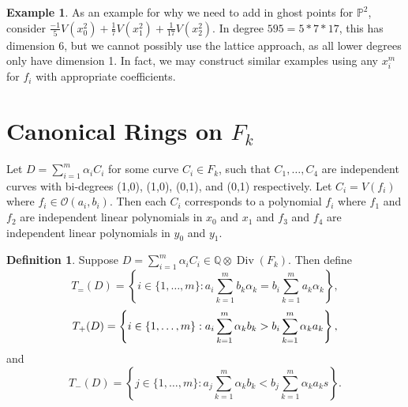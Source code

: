 \documentclass{amsart}
\theoremstyle{plain}
\theoremstyle{definition}
\newtheorem{defn}[thm]{Definition}
\newtheorem{example}[thm]{Example}
\theoremstyle{remark}
\numberwithin{equation}{section}
\newcommand\bp{{\mathbb P}}
\DeclareMathOperator\di{Div}
\begin{document}
\begin{example}
\label{eg:radical}
As an example for why we need to add in ghost points for $\bp^2$, consider $\frac{-1}{5}V(x_0^2) + \frac{1}{7}V(x_1^2) + \frac{1}{17}V(x_2^2)$. In degree $595 = 5* 7 * 17$, this has dimension $6$, but we cannot possibly use the lattice approach, as all lower degrees only have dimension 1. In fact, we may construct similar examples using any $x_i^m$ for $f_i$ with appropriate coefficients.
\end{example}

\section{Canonical Rings on \texorpdfstring{$F_k$}{}}
Let $D=\sum_{i=1}^m \alpha_i C_i$ for some curve $C_i\in F_k$, such that $C_1, \ldots, C_4$ are independent curves with bi-degrees (1,0), (1,0), (0,1), and (0,1) respectively.  Let $C_i = V(f_i)$ where $f_i \in \mathscr{O}(a_i, b_i)$.  Then each $C_i$ corresponds to a polynomial $f_i$ where $f_1$ and $f_2$ are independent linear polynomials in $x_0$ and $x_1$ and $f_3$ and $f_4$ are independent linear polynomials in $y_0$ and $y_1$.
\begin{defn}
Suppose $D = \sum_{i=1}^m \alpha_i C_i \in \mathbb{Q} \otimes \di(F_k)$.  Then define 
\begin{equation}\label{eqn:define-T=(D)}
	T_=(D) = \left\{i \in \{1, \ldots, m\}: a_i \sum_{k=1}^m b_k \alpha_k = b_i \sum_{k=1}^m a_k \alpha_k \right\},
\end{equation}
\begin{equation}\label{eqn:define-T+(D)}
	T_+(D) = \left\{ i \in \{1, \ldots, m\}:  \vphantom{\sum_{k=1}^m} a_i \sum_{k=1}^m \alpha_k b_k > b_i \sum_{k=1}^m \alpha_k a_k \right\},
\end{equation}
and
\begin{equation}\label{eqn:define-T-(D)}
	T_-(D) = \left\{ j \in \{1, \ldots, m\}: a_j \sum_{k=1}^m \alpha_k b_k < b_j \sum_{k=1}^m \alpha_k a_k s \right\}.
\end{equation}
\end{defn}
\end{document}
